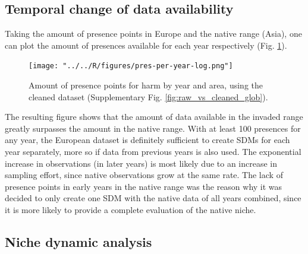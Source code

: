 \documentclass[12pt,a4paper]{article}
\begin{document}
\subsection{Temporal change of data availability} \label{ssec:temp_data_change}
Taking the amount of presence points in Europe and the native range (Asia), one can plot the amount of presences available for each year respectively (Fig. \ref{fig:pres_per_year_log}).

\begin{figure}[!h]
    \centering
    \texttt{[image: "../../R/figures/pres-per-year-log.png"]}
    \caption{\label{fig:pres_per_year_log} Amount of presence points for \gls{harm} by year and area, using the cleaned dataset (Supplementary Fig. \ref{fig:raw_vs_cleaned_glob}).}
\end{figure}

The resulting figure shows that the amount of data available in the invaded range greatly surpasses the amount in the native range.
With at least 100 presences for any year, the European dataset is definitely sufficient to create SDMs for each year separately, more so if data from previous years is also used.
The exponential increase in observations (in later years) is most likely due to an increase in sampling effort, since native observations grow at the same rate.
The lack of presence points in early years in the native range was the reason why it was decided to only create one SDM with the native data of all years combined, since it is more likely to provide a complete evaluation of the native niche.

\subsection{Niche dynamic analysis} \label{ssec:niche_dyn_analysis}
\end{document}
